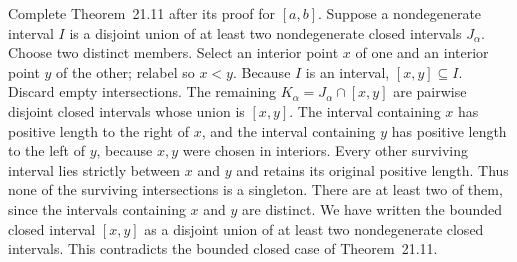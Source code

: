 \goal Complete Theorem~21.11 after its proof for $[a,b]$.
Suppose a nondegenerate interval $I$ is a disjoint union of at least
two nondegenerate closed intervals $J_\alpha$. Choose two distinct
members. Select an interior point $x$ of one and an interior point
$y$ of the other; relabel so $x<y$. Because $I$ is an interval,
$[x,y]\subseteq I$.
Discard empty intersections. The remaining
$K_\alpha=J_\alpha\cap[x,y]$ are pairwise disjoint closed intervals
whose union is $[x,y]$. The interval containing $x$ has positive
length to the right of $x$, and the interval containing $y$ has
positive length to the left of $y$, because $x,y$ were chosen in
interiors. Every other surviving interval lies strictly between
$x$ and $y$ and retains its original positive length. Thus none of
the surviving intersections is a singleton. There are at least two
of them, since the intervals containing $x$ and $y$ are distinct.
We have written the bounded closed interval $[x,y]$ as a disjoint
union of at least two nondegenerate closed intervals. This contradicts
the bounded closed case of Theorem~21.11.
